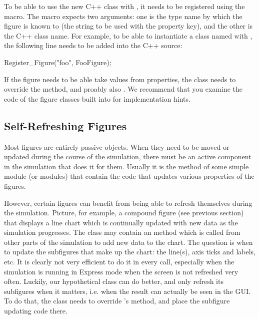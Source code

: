 To be able to use the new C++ class with ,
it needs to be registered using the  macro.
The macro expects two arguments: one is the type name by which the figure
is known to  (the string to be used with the  property key),
and the other is the C++ class name. For example, to be able to instantiate
a class named  with ,
the following line needs to be added into the C++ source:

\begin{cpp}
Register_Figure("foo", FooFigure);
\end{cpp}

If the figure needs to be able take values from  properties,
the class needs to override the  method,
and proably also . We recommend that
you examine the code of the figure classes built into {\opp} for
implementation hints.



\subsection{Self-Refreshing Figures}
\label{sec:graphics:self-refreshing-figures}

Most figures are entirely passive objects. When they need to be moved
or updated during the course of the simulation, there must be an
active component in the simulation that does it for them. Usually it is the
 method of some simple module (or modules) that
contain the code that updates various properties of the figures.

However, certain figures can benefit from being able to refresh themselves
during the simulation. Picture, for example, a compound figure (see
previous section) that displays a line chart which is continually
updated with new data as the simulation progresses. The 
class may contain an  method which is called
from other parts of the simulation to add new data to the chart.
The question is when to update the subfigures that make up the chart: the
line(s), axis ticks and labels, etc. It is clearly not very efficient
to do it in every  call, especially when the
simulation is running in Express mode when the screen is not refreshed
very often. Luckily, our hypothetical  class
can do better, and only refresh its subfigures when it matters, i.e.
when the result can actually be seen in the GUI. To do that, the class
needs to override 's  method, and
place the subfigure updating code there.


